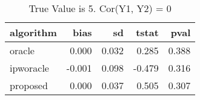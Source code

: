 \begin{table}[h!]

\caption{True Value is 5. Cor(Y1, Y2) = 0}
\centering
\begin{tabular}[t]{lrrrr}
\toprule
algorithm & bias & sd & tstat & pval\\
\midrule
oracle & 0.000 & 0.032 & 0.285 & 0.388\\
ipworacle & -0.001 & 0.098 & -0.479 & 0.316\\
proposed & 0.000 & 0.037 & 0.505 & 0.307\\
\bottomrule
\end{tabular}
\end{table}
